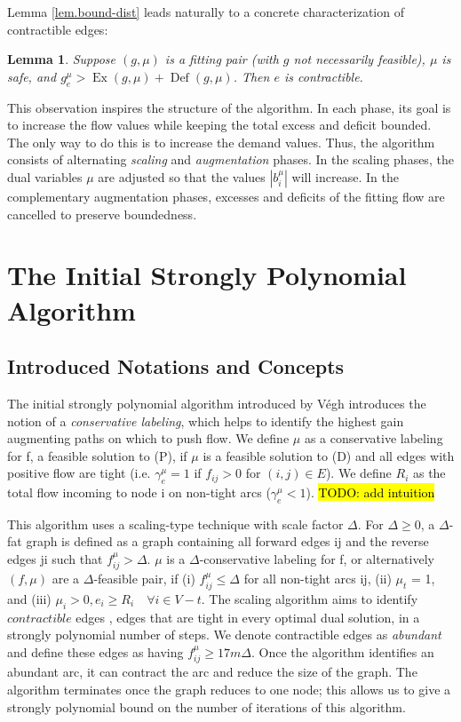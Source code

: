 \documentclass[11pt]{article}
\newtheorem{lemma}[theorem]{Lemma}
\theoremstyle{definition}
\theoremstyle{definition}
\newcommand{\biu}{b_{i}^{\mu}}
\newcommand{\geu}{\gamma_e^{\mu}}
\DeclareMathOperator{\Ex}{Ex}
\DeclareMathOperator{\Def}{Def}
\newcommand{\todo}[1]{\hl{TODO: #1}}
\begin{document}
    Lemma \ref{lem.bound-dist} leads naturally to a concrete characterization of contractible edges:
    \begin{lemma} \label{lem.contractibility}
    Suppose $(g, \mu)$ is a fitting pair (with $g$ not necessarily feasible),
    $\mu$ is safe, and $g^\mu_e > \Ex(g, \mu) + \Def(g, \mu)$.
    Then $e$ is contractible.
    \end{lemma}
    
    This observation inspires the structure of the algorithm. In each phase, its
    goal is to increase the flow values while keeping the total excess and deficit
    bounded. The only way to do this is to increase the demand values. Thus, the algorithm
    consists of alternating \emph{scaling} and \emph{augmentation} phases. In the scaling phases, the
    dual variables $\mu$ are adjusted so that the values $|\biu|$ will increase. In the
    complementary augmentation phases, excesses and deficits of the fitting flow are
    cancelled to preserve boundedness.
	

\section{The Initial Strongly Polynomial Algorithm}
	\subsection{Introduced Notations and Concepts}
	The initial strongly polynomial algorithm introduced by Végh \cite{Vegh2013}
	introduces the notion of a \textit{conservative labeling}, which helps to
	identify the highest gain augmenting paths on which to push flow. We define
	$\mu$ as a conservative labeling for f, a feasible solution to (P), if $\mu$ is
	a feasible solution to (D) and all edges with positive flow are tight
	(i.e. $\geu = 1$ if $f_{ij} > 0$ for $(i, j) \in E$). We define $R_i$ as
	the total flow incoming to node i on non-tight arcs ($\geu < 1$). \todo{add intuition}
	
	This algorithm uses a scaling-type technique with scale factor $\Delta$.
	For $\Delta \geq 0$, a $\Delta$-fat graph is defined as a graph containing all
	forward edges ij and the reverse edges ji such that $f_{ij}^\mu > \Delta$. $\mu$
	is a $\Delta$-conservative labeling for f, or alternatively $(f, \mu)$ are a
	$\Delta$-feasible pair, if (i) $f_{ij}^\mu \leq \Delta$ for all non-tight arcs ij,
	(ii) $\mu_t$ = 1, and (iii) $\mu_i > 0, e_i \geq R_i \quad \forall i \in V -t$.
	The scaling algorithm aims to identify $\textit{contractible}$ edges \cite{Orlin1988},
	edges that are tight in every optimal dual solution, in a strongly polynomial number of steps.
	We denote contractible edges as \emph{abundant} and define these edges as having
	$f_{ij}^\mu \geq 17m\Delta$. Once the algorithm identifies an abundant arc,
	it can contract the arc and reduce the size of the graph. The algorithm
	terminates once the graph reduces to one node; this allows us to give a
	strongly polynomial bound on the number of iterations of this algorithm.
\end{document}
